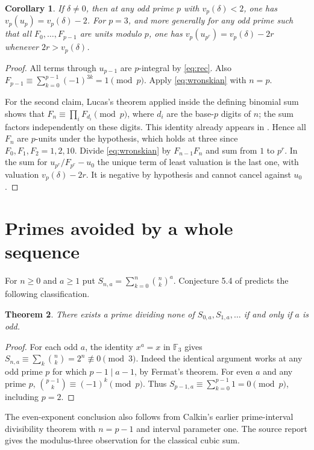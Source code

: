 \documentclass[10pt]{article}
\newtheorem{theorem}{Theorem}
\newtheorem{corollary}[theorem]{Corollary}
\begin{document}
\begin{corollary}
If $\delta\ne0$, then at any odd prime $p$ with $v_p(\delta)<2$,
one has $v_p(u_p)=v_p(\delta)-2$.
For $p=3$, and more generally for any odd prime such that all
$F_0,\ldots,F_{p-1}$ are units modulo $p$, one has
$v_p(u_{p^r})=v_p(\delta)-2r$ whenever $2r>v_p(\delta)$.
\end{corollary}
\begin{proof}
All terms through $u_{p-1}$ are $p$-integral by \eqref{eq:rec}. Also
$F_{p-1}\equiv\sum_{k=0}^{p-1}(-1)^{3k}=1\pmod p$.
Apply \eqref{eq:wronskian} with $n=p$.

For the second claim, Lucas's theorem applied inside the defining
binomial sum shows that $F_n\equiv\prod_i F_{d_i}\pmod p$, where
$d_i$ are the base-$p$ digits of $n$; the sum factors independently on
these digits. This identity already appears in \cite{report}.
Hence all $F_n$ are $p$-units under the hypothesis, which holds at three
since $F_0,F_1,F_2=1,2,10$. Divide \eqref{eq:wronskian} by
$F_{n-1}F_n$ and sum from $1$ to $p^r$. In the sum for
$u_{p^r}/F_{p^r}-u_0$ the unique term of least valuation is the last
one, with valuation $v_p(\delta)-2r$. It is negative by hypothesis
and cannot cancel against $u_0$.
\end{proof}

\section{Primes avoided by a whole sequence}
For $n\ge0$ and $a\ge1$ put $S_{n,a}=\sum_{k=0}^n\binom{n}{k}^{a}$.
Conjecture 5.4 of \cite{report} predicts the following classification.
\begin{theorem}
There exists a prime dividing none of $S_{0,a},S_{1,a},\ldots$
if and only if $a$ is odd.
\end{theorem}
\begin{proof}
For each odd $a$, the identity $x^a=x$ in $\mathbb F_3$ gives
$S_{n,a}\equiv\sum_k\binom nk=2^n\not\equiv0\pmod3$.
Indeed the identical argument works at any odd prime $p$ for which
$p-1\mid a-1$, by Fermat's theorem.
For even $a$ and any prime $p$, $\binom{p-1}{k}\equiv(-1)^k\pmod p$.
Thus $S_{p-1,a}\equiv\sum_{k=0}^{p-1}1=0\pmod p$, including $p=2$.
\end{proof}
The even-exponent conclusion also follows from Calkin's earlier
prime-interval divisibility theorem \cite[Proposition 3]{calkin}
with $n=p-1$ and interval parameter one. The source report gives
the modulus-three observation for the classical cubic sum.
\end{document}
